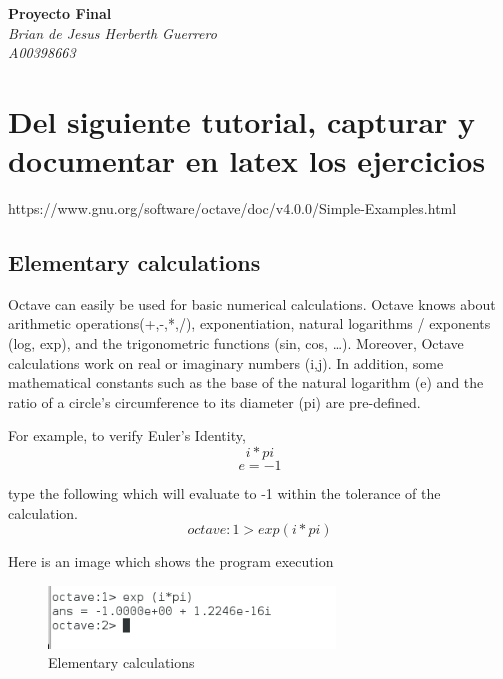 \documentclass[a4paper,12pt]{article}
\begin{document}
\begin{titlepage}
		\begin{center}
			\large\textbf{Proyecto Final}\\
			\large\textit{Brian de Jesus Herberth Guerrero}\\
			\large\textit{A00398663}
		\end{center}
\end{titlepage}

\section{Del siguiente tutorial, capturar y documentar en latex los ejercicios}
https://www.gnu.org/software/octave/doc/v4.0.0/Simple-Examples.html

\subsection{Elementary calculations}
\justifying
\par
Octave can easily be used for basic numerical calculations. Octave knows about arithmetic operations(+,-,*,/), exponentiation, natural logarithms / exponents (log, exp), and the trigonometric functions (sin, cos, …). Moreover, Octave calculations work on real or imaginary numbers (i,j). In addition, some mathematical constants such as the base of the natural logarithm (e) and the ratio of a circle’s circumference to its diameter (pi) are pre-defined.
\par
For example, to verify Euler’s Identity,
\begin{equation}
    \label{simple_equation}
    i * pi
\end{equation}
\begin{equation}
    \label{simple_equation}
    e = -1
\end{equation}
\par
type the following which will evaluate to -1 within the tolerance of the calculation.
\begin{equation}
    \label{simple_equation}
    octave:1> exp (i*pi)
\end{equation}
\par
Here is an image which shows the program execution
\begin{figure}[H]
    \centering
    \includegraphics[width=3.0in]{img/1.png}
    \caption{Elementary calculations}
    \label{simulationfigure}
\end{figure}
\end{document}
